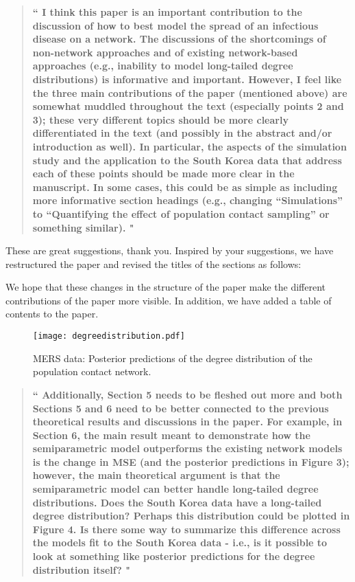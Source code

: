 \documentclass[12pt]{article}
\renewcommand{\s}{\vspace{0.1cm}}
\renewcommand{\=}{&=&}
\renewcommand{\bbq}{\vspace{.05cm}\begin{quote}\bf``}
\renewcommand{\ebq}{\hspace{-.15cm}"\end{quote}}
\renewcommand{\=}{&=&}
\begin{document}
\bbq
I think this paper is an important contribution to the discussion of how to best model the spread of an infectious disease on a network. The discussions of the shortcomings of non-network approaches and of existing network-based approaches (e.g., inability to model long-tailed degree distributions) is informative and important. However, I feel like the three main contributions of the paper (mentioned above) are somewhat muddled throughout the text (especially points 2 and 3); these very different topics should be more clearly differentiated in the text (and possibly in the abstract and/or introduction as well). In particular, the aspects of the simulation study and the application to the South Korea data that address each of these points should be made more clear in the manuscript. In some cases, this could be as simple as including more informative section headings (e.g., changing “Simulations” to “Quantifying the effect of population contact sampling” or something similar).
\ebq

These are great suggestions, 
thank you.
Inspired by your suggestions,
we have restructured the paper and revised the titles of the sections as follows:

We hope that these changes in the structure of the paper make the different contributions of the paper more visible.
In addition,
we have added a table of contents to the paper.

\setcounter{figure}{6}
\begin{figure}
\caption{\label{ppc.degrees}
MERS data: Posterior predictions of the degree distribution of the population contact network.}\s
\centering
  \texttt{[image: degreedistribution.pdf]}
\end{figure}

\bbq
Additionally, Section 5 needs to be fleshed out more and both Sections 5 and 6 need to be better connected to the previous theoretical results and discussions in the paper. For example, in Section 6, the main result meant to demonstrate how the semiparametric model outperforms the existing network models is the change in MSE (and the posterior predictions in Figure 3); however, the main theoretical argument is that the semiparametric model can better handle long-tailed degree distributions. Does the South Korea data have a long-tailed degree distribution? Perhaps this distribution could be plotted in Figure 4. Is there some way to summarize this difference across the models fit to the South Korea data - i.e., is it possible to look at something like posterior predictions for the degree distribution itself?
\ebq
\end{document}
